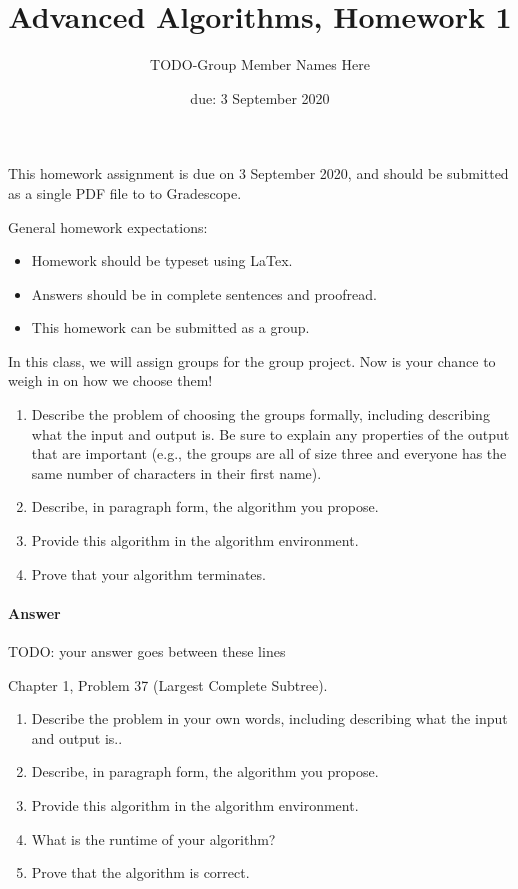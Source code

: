 \documentclass{article}
\title{Advanced Algorithms, Homework 1}
\author{TODO-Group Member Names Here}
\date{due: 3 September 2020}
\begin{document}
\maketitle

This homework assignment is due on 3 September 2020, and should be
submitted as a single PDF file to to Gradescope.

General homework expectations:
\begin{itemize}
    \item Homework should be typeset using LaTex.
    \item Answers should be in complete sentences and proofread.
    \item This homework can be submitted as a group.
\end{itemize}

\nextprob
{}

In this class, we will assign groups for the group project.  Now is your chance
to weigh in on how we choose them!
\begin{enumerate}
    \item Describe the problem of choosing the groups formally, including
        describing what the input and output is.  Be sure to explain any
        properties of the output that are important (e.g., the groups are all of
        size three and everyone has the same number of characters in their first
        name).
    \item Describe, in paragraph form, the algorithm you propose.
    \item Provide this algorithm in the algorithm environment.
    \item Prove that your algorithm terminates.
\end{enumerate}

\paragraph{Answer}


TODO: your answer goes between these lines


\nextprob
{}

Chapter 1, Problem 37 (Largest Complete Subtree).

\begin{enumerate}
    \item Describe the problem in your own words, including
        describing what the input and output is..
    \item Describe, in paragraph form, the algorithm you propose.
    \item Provide this algorithm in the algorithm environment.
    \item What is the runtime of your algorithm?
    \item Prove that the algorithm is correct.
\end{enumerate}
\end{document}
